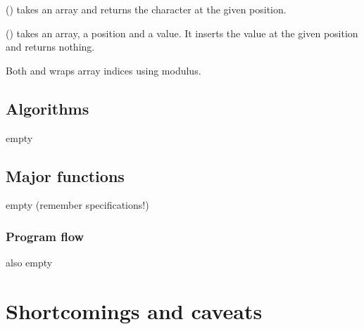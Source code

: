 \documentclass[12pt, a4paper]{article}
\begin{document}
\vspace{6pt}
\noindent
{} () takes an array and returns the character at the given position.

\vspace{6pt}
\noindent
{} () takes an array, a position and a value. It inserts the value at the given position and returns nothing.

\vspace{6pt}
\noindent
Both  and  wraps array indices using modulus.

\subsection{Algorithms}
\label{sec:algorithms}

empty

\subsection{Major functions}
\label{sec:functions}

empty (remember specifications!)

\subsubsection{Program flow}
\label{sec:flow}

also empty

\section{Shortcomings and caveats}

\vfill



\end{document}
